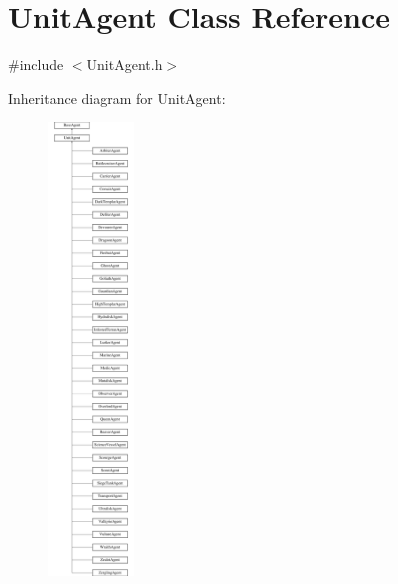 \hypertarget{class_unit_agent}{\section{Unit\-Agent Class Reference}
\label{class_unit_agent}
}


{\ttfamily \#include $<$Unit\-Agent.\-h$>$}

Inheritance diagram for Unit\-Agent\-:\begin{figure}[H]
\begin{center}
\leavevmode
\includegraphics[height=12.000000cm]{class_unit_agent}
\end{center}
\end{figure}
